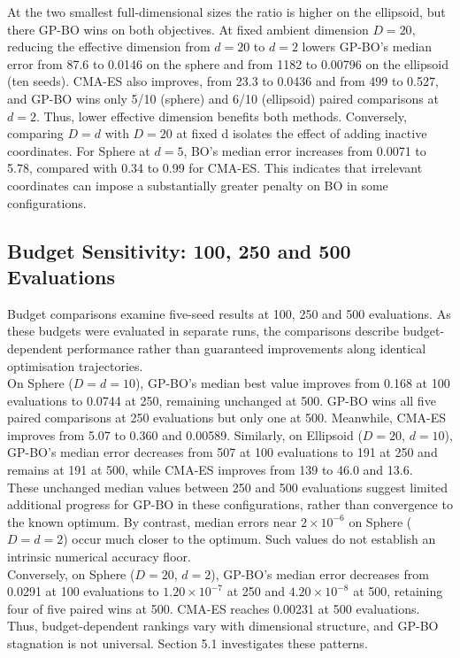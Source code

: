 \documentclass[11pt]{article}
\begin{document}
\noindent At the two smallest full-dimensional sizes the ratio is higher on the ellipsoid, but there GP-BO wins on both objectives. At fixed ambient dimension $D = 20$, reducing the effective dimension from $d = 20$ to $d = 2$ lowers GP-BO’s median error from 87.6 to 0.0146 on the sphere and from 1182 to 0.00796 on the ellipsoid (ten seeds). CMA-ES also improves, from 23.3 to 0.0436 and from 499 to 0.527, and GP-BO wins only 5/10 (sphere) and 6/10 (ellipsoid) paired comparisons at $d = 2$. Thus, lower effective dimension benefits both methods. Conversely, comparing $D=d$ with $D=20$ at fixed d isolates the effect of adding inactive coordinates. For Sphere at $d=5$, BO's median error increases from 0.0071 to 5.78, compared with 0.34 to 0.99 for CMA-ES. This indicates that irrelevant coordinates can impose a substantially greater penalty on BO in some configurations.


\subsection{Budget Sensitivity: 100, 250 and 500 Evaluations}

\noindent Budget comparisons examine five-seed results at 100, 250 and 500 evaluations. As these budgets were evaluated in separate runs, the comparisons describe budget-dependent performance rather than guaranteed improvements along identical optimisation trajectories.\\

\noindent On Sphere ($D=d=10$), GP-BO's median best value improves from 0.168 at 100 evaluations to 0.0744 at 250, remaining unchanged at 500. GP-BO wins all five paired comparisons at 250 evaluations but only one at 500. Meanwhile, CMA-ES improves from 5.07 to 0.360 and 0.00589. Similarly, on Ellipsoid ($D=20$, $d=10$), GP-BO's median error decreases from 507 at 100 evaluations to 191 at 250 and remains at 191 at 500, while CMA-ES improves from 139 to 46.0 and 13.6.\\

\noindent These unchanged median values between 250 and 500 evaluations suggest limited additional progress for GP-BO in these configurations, rather than convergence to the known optimum. By contrast, median errors near $2\times10^{-6}$ on Sphere ($D=d=2$) occur much closer to the optimum. Such values do not establish an intrinsic numerical accuracy floor.\\

\noindent Conversely, on Sphere ($D=20$, $d=2$), GP-BO's median error decreases from 0.0291 at 100 evaluations to $1.20\times10^{-7}$ at 250 and $4.20\times10^{-8}$ at 500, retaining four of five paired wins at 500. CMA-ES reaches 0.00231 at 500 evaluations. Thus, budget-dependent rankings vary with dimensional structure, and GP-BO stagnation is not universal. Section 5.1 investigates these patterns.\\
\end{document}
